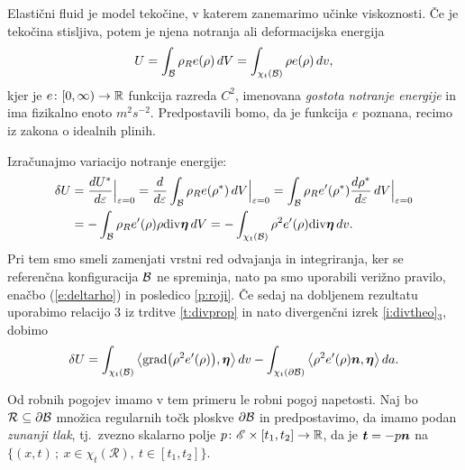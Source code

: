 Elastični fluid je model tekočine, v katerem zanemarimo učinke viskoznosti. Če je tekočina
stisljiva, potem je njena notranja ali deformacijska energija
\[ U=\int_{\mathcal B}\rho_R e(\rho)\,dV=\int_{\chi_t(\mathcal B)}\rho e(\rho)\,dv, \]
kjer je $e\colon[0,\infty)\to\mathbb R$ funkcija razreda $C^2$, imenovana
\emph{gostota notranje energije} in ima fizikalno enoto $m^2s^{-2}$.
Predpostavili bomo, da je funkcija $e$ poznana, recimo iz zakona o idealnih plinih.

Izračunajmo variacijo notranje energije:
\begin{align*} 
	\delta U &=\frac{dU^*}{d\varepsilon}\Big|_{\varepsilon=0}=\frac{d}{d\varepsilon}
	\int_{\mathcal B}\rho_R e(\rho^*)\,dV \Big|_{\varepsilon=0} =
	\int_{\mathcal B}\rho_R e'(\rho^*)\frac{d\rho^*}{d\varepsilon}\,dV \Big|_{\varepsilon=0} \\
	&= -\int_{\mathcal B}\rho_R e'(\rho)\rho\mathrm{div}\boldsymbol \eta\,dV
	= -\int_{\chi_t(\mathcal B)}\rho^2 e'(\rho)\mathrm{div}\boldsymbol \eta\,dv.
\end{align*}
Pri tem smo smeli zamenjati vrstni red odvajanja in integriranja, ker se referenčna
konfiguracija $\mathcal B$ ne spreminja, nato pa smo uporabili verižno pravilo, enačbo
(\ref{e:deltarho}) in posledico \ref{p:roji}.
Če sedaj na dobljenem rezultatu uporabimo relacijo 3 iz trditve \ref{t:divprop} in
nato divergenčni izrek \ref{i:divtheo}$_3$, dobimo
\begin{equation} \label{e:varpot}
	\delta U=\int_{\chi_t(\mathcal B)}\big<\mathrm{grad}\big(\rho^2 e'(\rho)\big),\boldsymbol \eta\big>\,dv
	-\int_{\chi_t(\partial \mathcal B)}\big<\rho^2 e'(\rho)\boldsymbol n,\boldsymbol \eta\big>\,da.
\end{equation}

Od robnih pogojev imamo v tem primeru le robni pogoj napetosti.
Naj bo $\mathcal{R}\subseteq\partial \mathcal B$ množica regularnih točk ploskve $\partial \mathcal B$ in
predpostavimo, da imamo podan \emph{zunanji tlak}, tj.~zvezno skalarno polje
$p\colon \mathscr E\times[t_1,t_2]\to\mathbb R$, da je $\boldsymbol t=-p\boldsymbol n$ na
$\{(x,t)\,;\ x\in\chi_t(\mathcal{R}),\ t\in[t_1,t_2]\}$.

